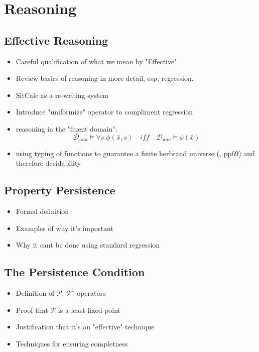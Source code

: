 \chapter{Reasoning}\label{ch:reasoning}

\section{Effective Reasoning}

\begin{itemize}
\item Careful qualification of what we mean by "Effective"
\item Review basics of reasoning in more detail, esp. regression.
\item SitCalc as a re-writing system
\item Introduce "uniformize" operator to compliment regression
\item reasoning in the "fluent domain":
\begin{equation*}
\mathcal{D}_{una} \models \forall s. \phi(\bar{x},s)\,\,\,\,\,\,iff\,\,\,\,\,\,\mathcal{D}_{una} \models \phi(\bar{x})
\end{equation*}
\item using typing of functions to guarantee a finite herbrand universe (\cite{levesque04krr_book}, pp69) and therefore decidability
\end{itemize}

\section{Property Persistence}

\begin{itemize}
\item Formal definition
\item Examples of why it's important
\item Why it cant be done using standard regression
\end{itemize}

\section{The Persistence Condition}

\begin{itemize}
\item Definition of $\mathcal{P}$, $\mathcal{P}^{1}$ operators
\item Proof that $\mathcal{P}$ is a least-fixed-point
\item Justification that it's an "effective" technique
\item Techniques for ensuring completness
\end{itemize}

